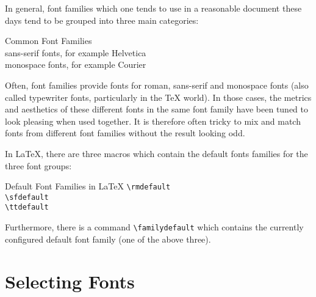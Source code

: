 \documentclass[a4paper,oneside,11pt]{article}
\newcommand\comm[1]{\texttt{\textbackslash#1}}
\begin{document}
In general,  font families  which one  tends to use  in a  reasonable document
these days tend to be grouped into three main categories\footnotemark:


\begin{titled-frame}
    {\textsf{Common Font Families}}
    \\
    {\selectfont sans-serif fonts, for example Helvetica}\\
    {\selectfont monospace fonts, for example Courier}
\end{titled-frame}

Often, font families  provide fonts for roman, sans-serif  and monospace fonts
(also called  typewriter fonts,  particularly in  the \TeX{}  world). In those
cases, the  metrics and aesthetics of  these different fonts in  the same font
family have  been tuned to look  pleasing when used together. It  is therefore
often tricky to  mix and match fonts from different  font families without the
result looking odd\footnotemark.


In \LaTeX, there are three macros which contain the default fonts families for
the three font groups:

\begin{titled-frame}
    {\textsf{Default Font Families in \LaTeX}}
    \noindent\comm{rmdefault}\\
    \comm{sfdefault}\\
    \comm{ttdefault}
\end{titled-frame}

Furthermore,  there  is  a  command \comm{familydefault}  which  contains  the
currently configured default font family (one of the above three).


\section{Selecting Fonts}
\label{sec:setting-fonts}
\end{document}
